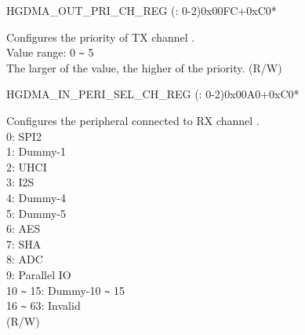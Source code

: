 \begin{register}{H}{GDMA\_OUT\_PRI\_CH\_REG (: 0-2)}{0x00FC+0xC0*}\label{regdesc:GDMAOUTPRICHNREG}
%
%
\regnewline%
\begin{regdesc}\begin{reglist}
\label{fielddesc:GDMATXPRICHN}\item [GDMA\_TX\_PRI\_CH\regindex{n}] Configures the priority of TX channel .\\
Value range: 0 \verb+~+ 5\\
The larger of the value, the higher of the priority. (R/W)
\end{reglist}\end{regdesc}
\end{register}


\begin{register}{H}{GDMA\_IN\_PERI\_SEL\_CH\_REG (: 0-2)}{0x00A0+0xC0*}\label{regdesc:GDMAINPERISELCHNREG}
%
%
\regnewline%
\begin{regdesc}\begin{reglist}
\label{fielddesc:GDMAPERIINSELCHN}\item [GDMA\_PERI\_IN\_SEL\_CH\regindex{n}] Configures the peripheral connected to RX channel .\\
0: SPI2\\
1: Dummy-1\\
2: UHCI\\
3: I2S\\
4: Dummy-4\\
5: Dummy-5\\
6: AES\\
7: SHA\\
8: ADC\\
9: Parallel IO\\
10 \verb+~+ 15: Dummy-10  \verb+~+  15\\
16 \verb+~+ 63: Invalid\\
(R/W)
\end{reglist}\end{regdesc}
\end{register}


